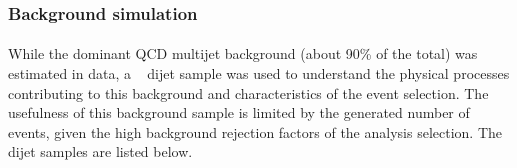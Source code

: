 
\clearpage
\subsubsection{Background simulation}
\paragraph{}
While the dominant QCD multijet background (about 90\% of the total) was estimated in data, a \Pythia~\cite{pythia8} dijet sample was used to understand the physical processes contributing to this background and characteristics of the event selection. The usefulness of this background sample is limited by the generated number of events, given the high background rejection factors of the analysis selection. The dijet samples are listed below.
\\ \\
\noindent
